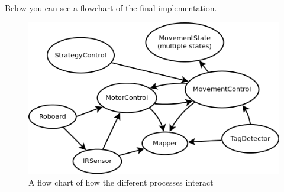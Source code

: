 Below you can see a flowchart of the final implementation.

\begin{figure}[h!]
\label{fig:flow_chart}
    \begin{centering}
   	 \includegraphics[scale=0.5]{figures/flow_chart.png}
   	 \caption{A flow chart of how the different processes interact}\label{fig:flow_chart}
    \end{centering}
\end{figure}

